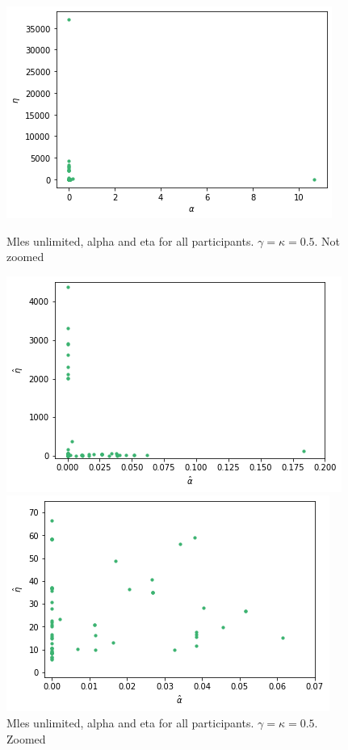 \begin{figure}
    \centering
    \begin{minipage}{0.48\textwidth}
        \centering
        \includegraphics[scale=0.37]{pictures/Gamma=kappa=0.5/plotted_mles_unlim_gk0.5.png}
        \caption{Mles unlimited, alpha and eta for all participants. $\gamma=\kappa=0.5$.    Not zoomed}
        \label{fig:gk0.5_mles_unlimited}
    \end{minipage}\hfill%
    \begin{minipage}{0.48\textwidth}
        \centering
        \includegraphics[scale=0.37]{pictures/Gamma=kappa=0.5/plotted_mles_unlim_gk0.5_zoomed.png}
        \caption{Mles unlimited, alpha and eta for all participants. $\gamma=\kappa=0.5$. Zoomed}
        \label{fig:gk0.5_mles_unlimited_zoomed}
    \end{minipage}
    \vfill
    \begin{minipage}{0.48\textwidth}
        \centering
        \includegraphics[scale=0.37]{pictures/Gamma=kappa=0.5/plotted_mles_unlim_gk0.5_zoomed2.png}

\end{minipage}
\end{figure}
